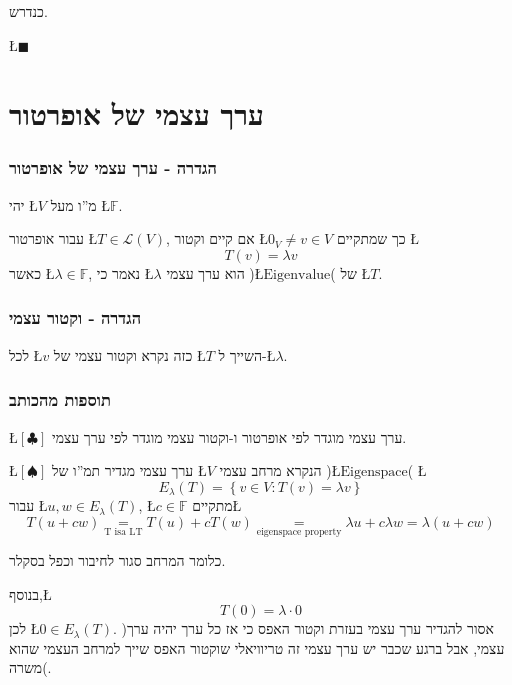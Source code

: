 \documentclass[english,hebrew]{article}
\begin{document}
כנדרש.

\hfill{}\L{$\blacksquare$}

\part{ערך עצמי של אופרטור}

\section{הגדרה - ערך עצמי של אופרטור }

יהי \L{$V$} מ\textquotedblright ו מעל \L{$\mathbb{F}$}.

עבור אופרטור \L{$T\in\mathcal{L}(V)$}, אם קיים וקטור \L{$0_{V}\ne v\in V$}
כך שמתקיים \L{%
\[
T(v)=\lambda v
\]
}%
כאשר \L{$\lambda\in\mathbb{F}$}, נאמר כי \L{$\lambda$} הוא ערך עצמי
)\L{$\text{Eigenvalue}$}( של \L{$T$}.

\section{הגדרה - וקטור עצמי}

לכל \L{$v$} כזה נקרא וקטור עצמי של \L{$T$} השייך ל-\L{$\lambda$}. 

\section{תוספות מהכותב}

\L{$\left[\clubsuit\right]$} ערך עצמי מוגדר לפי אופרטור ו-וקטור עצמי
מוגדר לפי ערך עצמי.

\L{$\left[\spadesuit\right]$} ערך עצמי מגדיר תמ\textquotedblright ו
של \L{$V$} הנקרא מרחב עצמי )\L{$\text{Eigenspace}$}( \L{%
\[
E_{\lambda}(T)=\left\{ v\in V:T(v)=\lambda v\right\} 
\]
}%
עבור \L{$u,w\in E_{\lambda}(T)$}, \L{$c\in\mathbb{F}$} מתקיים\L{%
\[
T(u+cw)\underset{\text{T isa LT}}{=}T(u)+cT(w)\underset{\text{eigenspace property}}{=}\lambda u+c\lambda w=\lambda(u+cw)
\]
}%

כלומר המרחב סגור לחיבור וכפל בסקלר.

בנוסף,\L{%
\[
T(0)=\lambda\cdot0
\]
}%
לכן \L{$0\in E_{\lambda}(T)$}. )אסור להגדיר ערך עצמי בעזרת וקטור
האפס כי אז כל ערך יהיה ערך עצמי, אבל ברגע שכבר יש ערך עצמי זה טריוויאלי
שוקטור האפס שייך למרחב העצמי שהוא משרה(.
\end{document}
